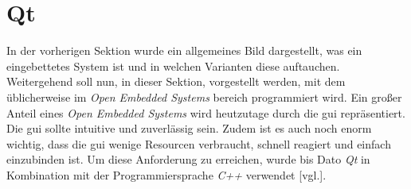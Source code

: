 \section{Qt}
\label{sec:qt}
In der vorherigen Sektion wurde ein allgemeines Bild dargestellt, was ein eingebettetes System
ist und in welchen Varianten diese auftauchen. Weitergehend soll nun, in dieser Sektion,
vorgestellt werden, mit dem üblicherweise im \emph{Open Embedded Systems} bereich programmiert wird.
\newline
\newline
Ein großer Anteil eines \emph{Open Embedded Systems} wird heutzutage durch die \ac{gui}
repräsentiert. Die \ac{gui} sollte intuitive und zuverlässig sein.
Zudem ist es auch noch enorm wichtig, dass die \ac{gui} wenige Resourcen verbraucht, schnell
reagiert und einfach einzubinden ist. Um diese Anforderung zu erreichen, wurde bis Dato \emph{Qt} in
Kombination mit der Programmiersprache \emph{C++} verwendet \cite{QtOnEmbeddedLinux}[vgl.].






